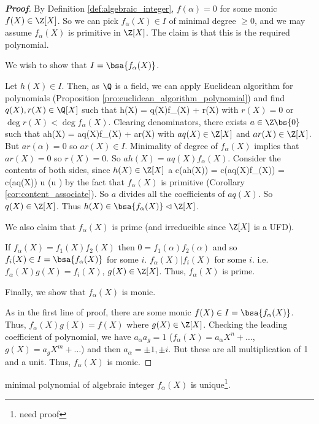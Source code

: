 \begin{proof}[\bf Proof]
By Definition \ref{def:algebraic_integer}, $f(\alpha) = 0$ for some monic $f(X) \in \Z[X]$. So we can pick $f_\alpha(X)\in I$ of minimal degree $\geq 0$, and we may assume $f_\alpha(X)$ is primitive in $\Z[X]$. The claim is that this is the required polynomial.

We wish to show that $I = \bsa{f_\alpha(X)}$.

Let $h(X) \in I$. Then, as $\Q$ is a field, we can apply Euclidean algorithm for polynomials (Proposition \ref{pro:euclidean_algorithm_polynomial}) and find $q(X),r(X)\in \Q[X]$ such that%
\be
h(X) = q(X)f_\alpha(X) + r(X)
\ee
with $r(X) = 0$ or $\deg r(X) < \deg f_\alpha(X)$. Clearing denominators, there exists $a \in \Z\bs\{0\}$ such that
\be
ah(X) = aq(X)f_\alpha(X) + ar(X)
\ee
with $aq(X) \in \Z[X]$ and $ar(X) \in \Z[X]$. But $ar(\alpha) = 0$ so $ar(X) \in I$. Minimality of degree of $f_\alpha(X)$ implies that $ar(X) = 0$ so $r(X) = 0$. So $ah(X) = aq(X)f_\alpha(X)$. Consider the contents of both sides, since $h(X)\in \Z[X]$
\be
a \mid c(ah(X)) = c(aq(X)f_\alpha(X)) = c(aq(X)) u \quad (u )
\ee
by the fact that $f_\alpha(X)$ is primitive (Corollary \ref{cor:content_associate}). So $a$ divides all the coefficients of $aq(X)$. So $q(X)\in \Z[X]$. Thus $h(X) \in \bsa{f_\alpha(X)} \lhd \Z[X]$.

We also claim that $f_\alpha(X)$ is prime (and irreducible since $\Z[X]$ is a UFD).

If $f_\alpha(X) = f_1(X)f_2(X)$ then $0 = f_1(\alpha)f_2(\alpha)$ and so $f_i(X) \in I = \bsa{f_\alpha(X)}$ for some $i$. $f_\alpha(X) | f_i(X)$ for some $i$. i.e. $f_\alpha (X) g(X) = f_i(X)$, $g(X) \in \Z[X]$. Thus, $f_\alpha (X)$ is prime.

Finally, we show that $f_\alpha(X)$ is monic.

As in the first line of proof, there are some monic $f(X)\in I = \bsa{f_\alpha(X)}$. Thus, $f_\alpha(X) g(X) = f(X)$ where $g(X) \in \Z[X]$. Checking the leading coefficient of polynomial, we have $a_\alpha a_g = 1$ ($f_\alpha (X) = a_\alpha X^n + \dots$, $g(X) = a_g X^m + \dots $) and then $a_\alpha = \pm 1,\pm i$. But these are all multiplication of 1 and a unit. Thus, $f_\alpha (X)$ is monic.
\end{proof}

\begin{remark}
minimal polynomial of algebraic integer $f_\alpha(X)$ is unique\footnote{need proof}.
\end{remark}

